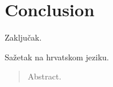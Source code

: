 \documentclass[times, utf8, diplomski]{fer}
\begin{document}
\chapter{Conclusion}
Zaključak.





\begin{sazetak}
Sažetak na hrvatskom jeziku.

\end{sazetak}

\begin{abstract}
Abstract.

\end{abstract}
\end{document}
